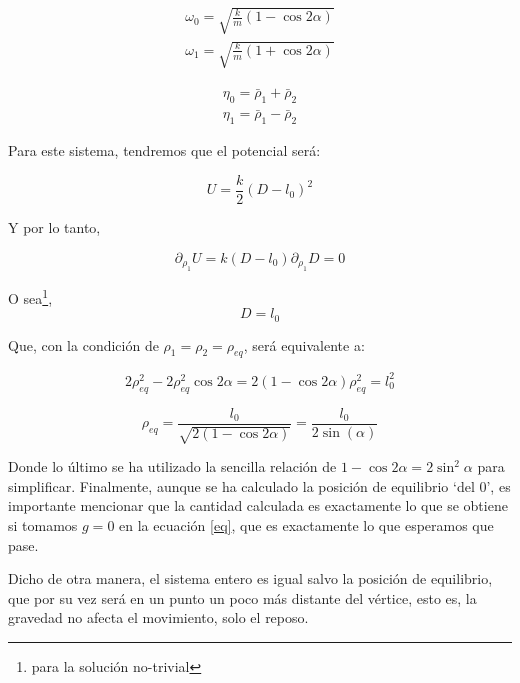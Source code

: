 \documentclass[a4paper,12pt]{article}
\begin{document}
\begin{equation}
  \begin{aligned}
  \omega_0 = \sqrt{ \frac{k}{m} (1 - \cos{2\alpha})}\\
  \omega_1 = \sqrt{ \frac{k}{m} (1 + \cos{2\alpha})}
  \end{aligned}
\end{equation}

\begin{equation}
  \begin{aligned}
  \eta_0 = \bar{\rho}_1 + \bar{\rho}_2\\
  \eta_1 = \bar{\rho}_1 - \bar{\rho}_2
  \end{aligned}
\end{equation}


Para este sistema, tendremos que el potencial será:

$$U = \frac{k}{2} (D-l_0)^{2}$$

Y por lo tanto,

$$\partial_{\rho_{1}}U = k(D-l_0)\partial_{\rho_{1}}D = 0 $$

O sea\footnote{para la solución no-trivial},
$$D = l_{0}$$

Que, con la condición de $\rho_1= \rho_2 = \rho_{eq}$, será equivalente a:

$$2\rho_{eq}^2 - 2\rho_{eq}^2 \cos{2\alpha} = 2(1-\cos{2\alpha}) \rho_{eq}^2 = l_0^2$$

\begin{equation}
\rho_{eq} = \frac{l_0}{\sqrt{2(1-\cos{2\alpha})}} = \frac{l_0}{2\sin(\alpha)}
\end{equation}

Donde lo último se ha utilizado la sencilla relación de $1-\cos{2\alpha} = 2\sin^2{\alpha}$ para simplificar. Finalmente, aunque se ha calculado la posición de equilibrio `del 0', es importante mencionar que la cantidad calculada es exactamente lo que se obtiene si tomamos $g=0$ en la ecuación \eqref{eq}, que es exactamente lo que esperamos que pase. 

Dicho de otra manera, el sistema entero es igual salvo la posición de equilibrio, que por su vez será en un punto un poco más distante del vértice, esto es, la gravedad no afecta el movimiento, solo el reposo.
 
\end{document}
